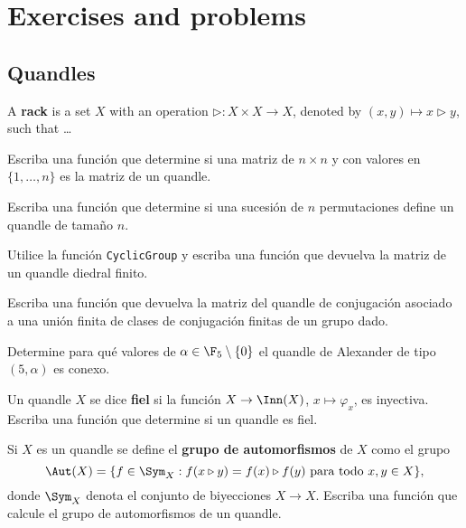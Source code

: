 \section{Exercises and problems}

\subsection{Quandles}

\begin{block}
	A \textbf{rack} is a set $X$ with an operation $\triangleright\colon
	X\times X\to X$, denoted by $(x,y)\mapsto x\triangleright y$, such that 
	\ldots
\end{block}

\begin{block}
	Escriba una función que determine si una matriz de $n\times n$ y con
	valores en $\{1,\dots,n\}$ es la matriz de un quandle. 
\end{block}

\begin{block}
	Escriba una función que determine si una sucesión de $n$ permutaciones
	define un quandle de tamaño $n$.
\end{block}

\begin{block}
	Utilice la función \lstinline{CyclicGroup} y escriba una función que
	devuelva la matriz de un quandle diedral finito.
\end{block}

\begin{block}
	Escriba una función que devuelva la matriz del quandle de conjugación
	asociado a una unión finita de clases de conjugación finitas de un grupo
	dado. 
\end{block}

\begin{block}
	Determine para qué valores de $\alpha\in\F_5\setminus\{0\}$ el quandle de
	Alexander de tipo $(5,\alpha)$ es conexo.
\end{block}

\begin{block}
	Un quandle $X$ se dice \textbf{fiel} si la función $X\to\Inn(X)$,
	$x\mapsto\varphi_x$, es inyectiva. Escriba una función que determine si un
	quandle es fiel.
\end{block}

\begin{block}
	Si $X$ es un quandle se define el \textbf{grupo de automorfismos} de $X$
	como el grupo 
	\[
	\Aut(X)=\{f\in\Sym_X:f(x\triangleright y)=f(x)\triangleright f(y)\text{ para todo $x,y\in X$}\},
	\]
	donde $\Sym_X$ denota el conjunto de biyecciones $X\to X$. Escriba una
	función que calcule el grupo de automorfismos de un quandle.
\end{block}


